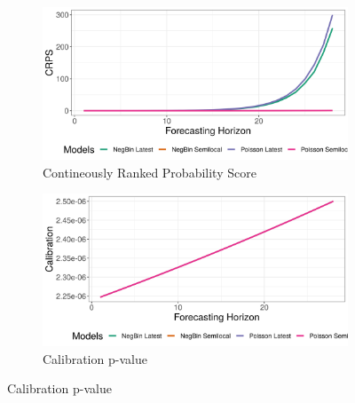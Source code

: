 \begin{figure}[H]
\begin{subfigure}{0.5\textwidth}
  \centering
  \includegraphics[width=\linewidth]{../output/Mambasa_crps.png}  
  \caption{Contineously Ranked Probability Score}
  \label{Mambasa_scores_1}
\end{subfigure}
\begin{subfigure}{0.5\textwidth}
  \centering
  \includegraphics[width=\linewidth]{../output/Mambasa_calibration.png}  
  \caption{Calibration p-value}
  \label{Mambasa_scores_2}
\end{subfigure}


\end{figure}
